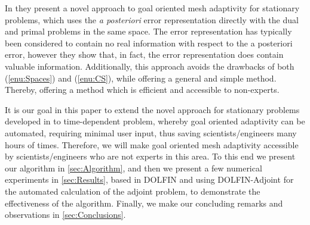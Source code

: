 In \cite{Jansson2014a, Jansson2014b} they present a novel approach to goal
oriented mesh adaptivity for stationary problems, which uses the {\it a
posteriori} error representation directly with the dual and primal problems in
the same space. The error representation has typically been considered to
contain no real information with respect to the {a posteriori} error, however
they show that, in fact, the error representation does contain valuable
information. Additionally, this approach avoids the drawbacks of both
(\ref{enu:Spaces}) and (\ref{enu:CS}), while offering a general and simple
method. Thereby, offering a method which is efficient and accessible to
non-experts.

It is our goal in this paper to extend the novel approach for stationary
problems developed in \cite{Jansson2014a, Jansson2014b} to time-dependent
problem, whereby goal oriented adaptivity can be automated, requiring minimal
user input, thus  saving scientists/engineers many hours of times. Therefore, we
will make goal oriented mesh adaptivity accessible by scientists/engineers who
are not experts in this area. To this end we present our algorithm in
\autoref{sec:Algorithm}, and then we present a few numerical experiments in
\autoref{sec:Results}, based in DOLFIN\cite{Alnae2011} and using
DOLFIN-Adjoint\cite{Ham2012} for the automated calculation of the adjoint
problem, to demonstrate the effectiveness of the algorithm. Finally, we make our
concluding remarks and observations in \autoref{sec:Conclusions}.
